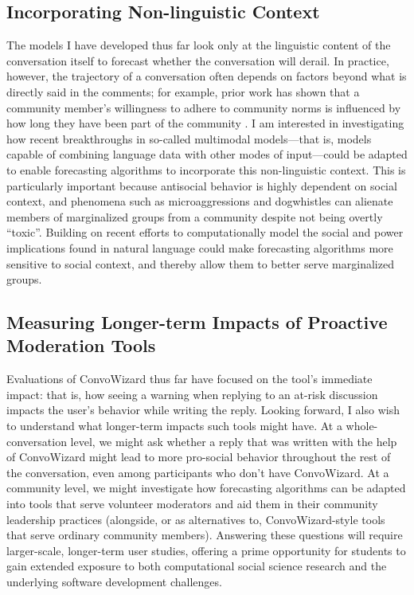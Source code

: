 \documentclass[12pt,letterpaper]{article}
\begin{document}
\subsection{Incorporating Non-linguistic Context}
The models I have developed thus far look only at the linguistic content of the conversation itself to forecast whether the conversation will derail.
In practice, however, the trajectory of a conversation often depends on factors beyond what is directly said in the comments; for example, prior work has shown that a community member's willingness to adhere to community norms is influenced by how long they have been part of the community \cite{danescu-niculescu-mizil_no_2013}.
I am interested in investigating how recent breakthroughs in so-called multimodal models---that is, models capable of combining language data with other modes of input---could be adapted to enable forecasting algorithms to incorporate this non-linguistic context.
This is particularly important because antisocial behavior is highly dependent on social context, and phenomena such as microaggressions and dogwhistles can alienate members of marginalized groups from a community despite not being overtly ``toxic''.
Building on recent efforts to computationally model the social and power implications found in natural language \cite{sap_social_2020} could make forecasting algorithms more sensitive to social context, and thereby allow them to better serve marginalized groups.


\subsection{Measuring Longer-term Impacts of Proactive Moderation Tools}
Evaluations of ConvoWizard thus far have focused on the tool's immediate impact: that is, how seeing a warning when replying to an at-risk discussion impacts the user's behavior while writing the reply.
Looking forward, I also wish to understand what longer-term impacts such tools might have.
At a whole-conversation level, we might ask whether a reply that was written with the help of ConvoWizard might lead to more pro-social behavior throughout the rest of the conversation, even among participants who don't have ConvoWizard.
At a community level, we might investigate how forecasting algorithms can be adapted into tools that serve volunteer moderators and aid them in their community leadership practices (alongside, or as alternatives to, ConvoWizard-style tools that serve ordinary community members).
Answering these questions will require larger-scale, longer-term user studies, offering a prime opportunity for students to gain extended exposure to both computational social science research and the underlying software development challenges.
\end{document}
